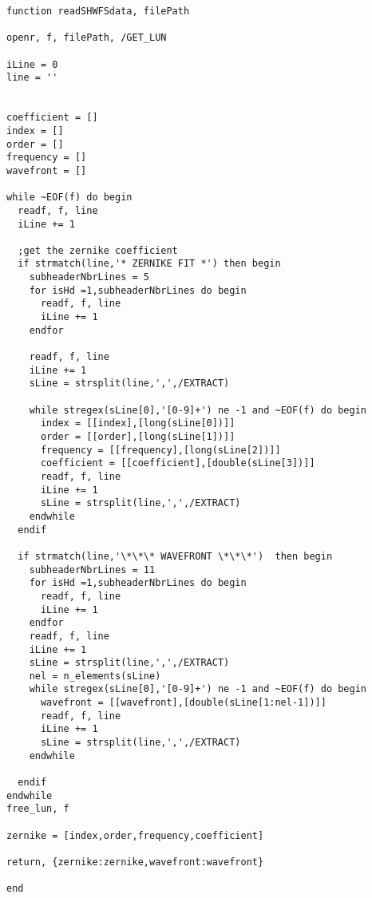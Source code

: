 \begin{lstlisting}
function readSHWFSdata, filePath

openr, f, filePath, /GET_LUN

iLine = 0
line = ''


coefficient = []
index = []
order = []
frequency = []
wavefront = []

while ~EOF(f) do begin
  readf, f, line
  iLine += 1
  
  ;get the zernike coefficient
  if strmatch(line,'* ZERNIKE FIT *') then begin
    subheaderNbrLines = 5
    for isHd =1,subheaderNbrLines do begin
      readf, f, line
      iLine += 1
    endfor
    
    readf, f, line
    iLine += 1
    sLine = strsplit(line,',',/EXTRACT)
    
    while stregex(sLine[0],'[0-9]+') ne -1 and ~EOF(f) do begin
      index = [[index],[long(sLine[0])]]
      order = [[order],[long(sLine[1])]]
      frequency = [[frequency],[long(sLine[2])]]
      coefficient = [[coefficient],[double(sLine[3])]]
      readf, f, line
      iLine += 1
      sLine = strsplit(line,',',/EXTRACT)
    endwhile
  endif
  
  if strmatch(line,'\*\*\* WAVEFRONT \*\*\*')  then begin
    subheaderNbrLines = 11
    for isHd =1,subheaderNbrLines do begin
      readf, f, line
      iLine += 1
    endfor
    readf, f, line
    iLine += 1
    sLine = strsplit(line,',',/EXTRACT)
    nel = n_elements(sLine)
    while stregex(sLine[0],'[0-9]+') ne -1 and ~EOF(f) do begin
      wavefront = [[wavefront],[double(sLine[1:nel-1])]]
      readf, f, line
      iLine += 1
      sLine = strsplit(line,',',/EXTRACT)
    endwhile
    
  endif
endwhile
free_lun, f

zernike = [index,order,frequency,coefficient]

return, {zernike:zernike,wavefront:wavefront}

end
\end{lstlisting}